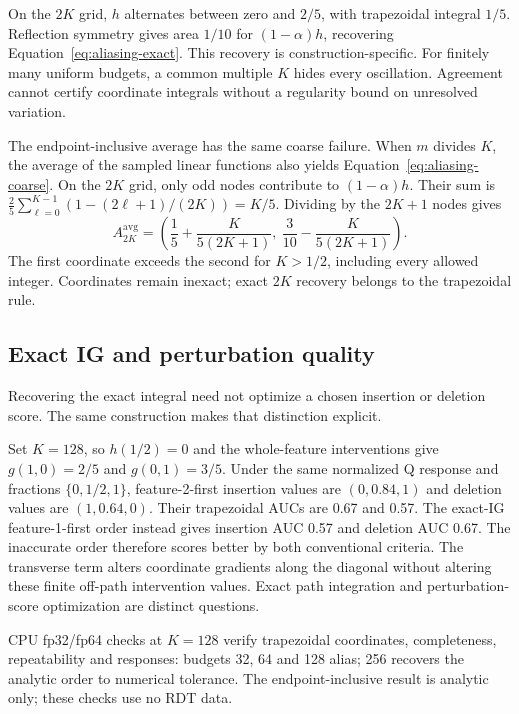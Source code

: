 \documentclass[12pt,letterpaper]{article}
\begin{document}
On the $2K$ grid, $h$ alternates between zero and $2/5$, with trapezoidal integral
$1/5$. Reflection symmetry gives area $1/10$ for $(1-\alpha)h$, recovering
Equation~\ref{eq:aliasing-exact}. This recovery is construction-specific. For
finitely many uniform budgets, a common multiple $K$ hides every oscillation.
Agreement cannot certify coordinate integrals without a regularity bound on unresolved variation.

The endpoint-inclusive average has the same coarse failure.
When $m$ divides $K$, the average of the sampled linear functions also yields
Equation~\ref{eq:aliasing-coarse}. On the $2K$ grid, only odd nodes contribute
to $(1-\alpha)h$. Their sum is
$\frac25\sum_{\ell=0}^{K-1}(1-(2\ell+1)/(2K))=K/5$.
Dividing by the $2K+1$ nodes gives
\begin{equation}
A_{2K}^{\mathrm{avg}}=
\left(\frac15+\frac{K}{5(2K+1)},\
\frac3{10}-\frac{K}{5(2K+1)}\right).
\label{eq:aliasing-average}
\end{equation}
The first coordinate exceeds the second for $K>1/2$, including every allowed
integer. Coordinates remain inexact; exact $2K$ recovery belongs to the trapezoidal rule.

\subsection{Exact IG and perturbation quality}
\label{sec:aliasing-quality}

Recovering the exact integral need not optimize a chosen insertion or deletion score. The same construction makes that distinction explicit.

Set $K=128$, so $h(1/2)=0$ and the whole-feature interventions give
$g(1,0)=2/5$ and $g(0,1)=3/5$. Under the same normalized Q response
and fractions $\{0,1/2,1\}$, feature-2-first insertion values are
$(0,0.84,1)$ and deletion values are $(1,0.64,0)$.
Their trapezoidal AUCs are 0.67 and 0.57.
The exact-IG feature-1-first order instead gives insertion AUC 0.57 and deletion AUC 0.67.
The inaccurate order therefore scores better by both conventional criteria.
The transverse term alters coordinate gradients along the diagonal without
altering these finite off-path intervention values. Exact path integration
and perturbation-score optimization are distinct questions.

CPU fp32/fp64 checks at $K=128$ verify trapezoidal coordinates, completeness,
repeatability and responses: budgets 32, 64 and 128 alias; 256 recovers the analytic
order to numerical tolerance. The endpoint-inclusive result is analytic only;
these checks use no RDT data.
\end{document}
